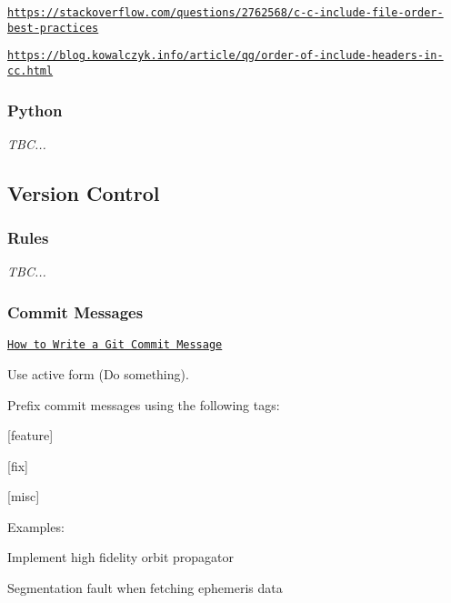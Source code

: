 \begin{DoxyItemize}
\item \href{https://stackoverflow.com/questions/2762568/c-c-include-file-order-best-practices}{\tt https\+://stackoverflow.\+com/questions/2762568/c-\/c-\/include-\/file-\/order-\/best-\/practices}
\item \href{https://blog.kowalczyk.info/article/qg/order-of-include-headers-in-cc.html}{\tt https\+://blog.\+kowalczyk.\+info/article/qg/order-\/of-\/include-\/headers-\/in-\/cc.\+html}
\end{DoxyItemize}\hypertarget{md__c_o_n_t_r_i_b_u_t_i_n_g_Python}{}\subsubsection{Python}\label{md__c_o_n_t_r_i_b_u_t_i_n_g_Python}
{\itshape T\+BC...}\hypertarget{md__c_o_n_t_r_i_b_u_t_i_n_g_Version}{}\subsection{Version Control}\label{md__c_o_n_t_r_i_b_u_t_i_n_g_Version}
\hypertarget{md__c_o_n_t_r_i_b_u_t_i_n_g_Rules}{}\subsubsection{Rules}\label{md__c_o_n_t_r_i_b_u_t_i_n_g_Rules}
{\itshape T\+BC...}\hypertarget{md__c_o_n_t_r_i_b_u_t_i_n_g_Commit}{}\subsubsection{Commit Messages}\label{md__c_o_n_t_r_i_b_u_t_i_n_g_Commit}
\href{https://chris.beams.io/posts/git-commit/}{\tt How to Write a Git Commit Message}

Use active form ({\ttfamily Do something}).

Prefix commit messages using the following tags\+:


\begin{DoxyItemize}
\item \mbox{[}feature\mbox{]}
\item \mbox{[}fix\mbox{]}
\item \mbox{[}misc\mbox{]}
\end{DoxyItemize}

Examples\+:


\begin{DoxyCode}
[feature] Implement high fidelity orbit propagator
\end{DoxyCode}



\begin{DoxyCode}
[fix] Segmentation fault when fetching ephemeris data
\end{DoxyCode}
 